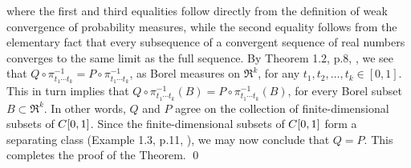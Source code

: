 where the first and third equalities follow directly from the definition of weak convergence of probability
measures, while the second equality follows from the elementary fact that every subsequence of a
convergent sequence of real numbers converges to the same limit as the full sequence.
By Theorem 1.2, p.8, \cite{Billingsley1999}, we see that
$Q\circ\pi_{t_{1}\cdots t_{k}}^{-1} = P\circ\pi_{t_{1}\cdots t_{k}}^{-1}$,
as Borel measures on $\Re^{k}$, for any $t_{1}, t_{2}, \ldots, t_{k} \in [0,1]$.
This in turn implies that $Q\circ\pi_{t_{1}\cdots t_{k}}^{-1}(B) = P\circ\pi_{t_{1}\cdots t_{k}}^{-1}(B)$,
for every Borel subset $B \subset \Re^{k}$.
In other words, $Q$ and $P$ agree on the collection of finite-dimensional subsets of $C[0,1]$.
Since the finite-dimensional subsets of $C[0,1]$ form a separating class
(Example 1.3, p.11, \cite{Billingsley1999}), we may now conclude that $Q = P$.
This completes the proof of the Theorem.
\qed


